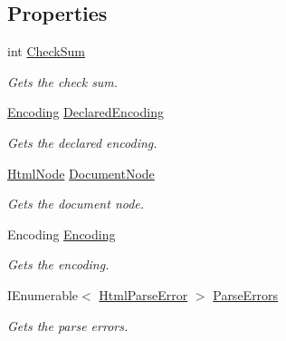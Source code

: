 \subsection*{Properties}
\begin{DoxyCompactItemize}
\item 
int \hyperlink{class_html_agility_pack_1_1_html_document_aaceb2c1640bc7e8ad19736dbe7023b46}{Check\+Sum}
\begin{DoxyCompactList}\small\item\em Gets the check sum. \end{DoxyCompactList}\item 
\hyperlink{class_html_agility_pack_1_1_html_document_a220bdf28a5e35f4898075084be2d59f0}{Encoding} \hyperlink{class_html_agility_pack_1_1_html_document_a30aefe9e05745898b500f93a3a43df5a}{Declared\+Encoding}
\begin{DoxyCompactList}\small\item\em Gets the declared encoding. \end{DoxyCompactList}\item 
\hyperlink{class_html_agility_pack_1_1_html_node}{Html\+Node} \hyperlink{class_html_agility_pack_1_1_html_document_a85eaf47c876d64dac9c5249f477006ae}{Document\+Node}
\begin{DoxyCompactList}\small\item\em Gets the document node. \end{DoxyCompactList}\item 
Encoding \hyperlink{class_html_agility_pack_1_1_html_document_a220bdf28a5e35f4898075084be2d59f0}{Encoding}
\begin{DoxyCompactList}\small\item\em Gets the encoding. \end{DoxyCompactList}\item 
I\+Enumerable$<$ \hyperlink{class_html_agility_pack_1_1_html_parse_error}{Html\+Parse\+Error} $>$ \hyperlink{class_html_agility_pack_1_1_html_document_ac2054351171c65da329218a8cbd610f9}{Parse\+Errors}
\begin{DoxyCompactList}\small\item\em Gets the parse errors. \end{DoxyCompactList}\item 

\end{DoxyCompactItemize}
